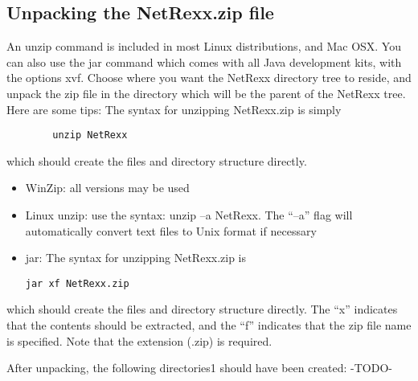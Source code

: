 \subsection{Unpacking the NetRexx.zip file} 
An unzip command is included in most Linux distributions, and Mac
OSX. You can also use the jar command which comes with all Java
development kits, with the options xvf.
Choose where you want the NetRexx directory tree to reside, and unpack the zip file in the directory which will be the parent of the NetRexx tree. Here are some tips: 
The syntax for unzipping NetRexx.zip is simply
\begin{verbatim}
        unzip NetRexx
\end{verbatim}
which should create the files and directory structure directly.
\begin{itemize} 
\item WinZip: all versions may be used
\item Linux unzip: use the syntax: unzip –a NetRexx. The “–a” flag will automatically convert text files to Unix format if necessary
\item jar: The syntax for unzipping NetRexx.zip is
\begin{verbatim} 
jar xf NetRexx.zip 
\end{verbatim}
\end{itemize}
which should create the files and directory structure directly. The “x” indicates that the contents should be extracted, and the “f” indicates that the zip file name is specified. Note that the extension (.zip) is required. 

After unpacking, the following directories1 should have been created:
-TODO-
